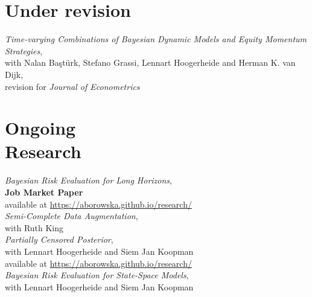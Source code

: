 \documentclass[margin,line]{resume}
\begin{document}
\begin{resume}
\section{\mysidestyle Under revision}
	\textit{Time-varying Combinations of Bayesian Dynamic Models and Equity Momentum Strategies},\\
	with Nalan Ba\c{s}t\"{u}rk, Stefano Grassi, Lennart Hoogerheide and Herman K. van Dijk,\\
	revision for \textit{Journal of Econometrics} \vspace{-5mm} \\ 
 	
\section{\mysidestyle Ongoing \\Research } 
   	\textit{Bayesian Risk Evaluation for Long Horizons},\\ 
   	\textbf{Job Market Paper} \\ 
   	available at \href{https://aborowska.github.io/research/A.Borowska\%20-\%20Bayesian\%20Risk\%20Evaluation\%20for\%20Long\%20Horizons.pdf}{https://aborowska.github.io/research/}  \vspace{1mm} \\
   	\textit{Semi-Complete Data Augmentation},\\ 
    with Ruth King \vspace{1mm} \\   
   	\textit{Partially Censored Posterior},\\ 
    with Lennart Hoogerheide and Siem Jan Koopman \\   	
   	available at \href{https://aborowska.github.io/research/Borowska,\%20Hoogerheide,\%20Koopman\%20-\%20Partially\%20censored\%20posterior\%20for\%20accurate\%20left\%20tail\%20density\%20prediction.pdf}{https://aborowska.github.io/research/} \vspace{1mm}\\
   	\textit{Bayesian Risk Evaluation for State-Space Models},\\ 
    with Lennart Hoogerheide and Siem Jan Koopman\vspace{1mm} \\  
      
\vspace{-4mm}





 \newpage	


\end{resume}
\end{document}
